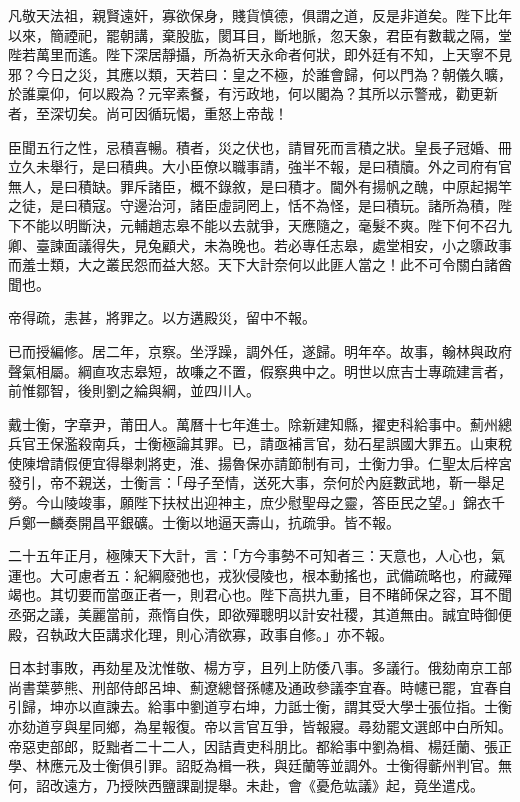 \begin{pinyinscope}
凡敬天法祖，親賢遠奸，寡欲保身，賤貨慎德，俱謂之道，反是非道矣。陛下比年以來，簡禋祀，罷朝講，棄股肱，閡耳目，斷地脈，忽天象，君臣有數載之隔，堂陛若萬里而遙。陛下深居靜攝，所為祈天永命者何狀，即外廷有不知，上天寧不見邪？今日之災，其應以類，天若曰：皇之不極，於誰會歸，何以門為？朝儀久曠，於誰稟仰，何以殿為？元宰素餐，有污政地，何以閣為？其所以示警戒，勸更新者，至深切矣。尚可因循玩愒，重怒上帝哉！

臣聞五行之性，忌積喜暢。積者，災之伏也，請冒死而言積之狀。皇長子冠婚、冊立久未舉行，是曰積典。大小臣僚以職事請，強半不報，是曰積牘。外之司府有官無人，是曰積缺。罪斥諸臣，概不錄敘，是曰積才。閫外有揚帆之醜，中原起揭竿之徒，是曰積寇。守邊治河，諸臣虛詞罔上，恬不為怪，是曰積玩。諸所為積，陛下不能以明斷決，元輔趙志皋不能以去就爭，天應隨之，毫髮不爽。陛下何不召九卿、臺諫面議得失，見兔顧犬，未為晚也。若必專任志皋，處堂相安，小之隳政事而羞士類，大之叢民怨而益大怒。天下大計奈何以此匪人當之！此不可令關白諸酋聞也。

帝得疏，恚甚，將罪之。以方遘殿災，留中不報。

已而授編修。居二年，京察。坐浮躁，調外任，遂歸。明年卒。故事，翰林與政府聲氣相屬。綱直攻志皋短，故嗛之不置，假察典中之。明世以庶吉士專疏建言者，前惟鄒智，後則劉之綸與綱，並四川人。

戴士衡，字章尹，莆田人。萬曆十七年進士。除新建知縣，擢吏科給事中。薊州總兵官王保濫殺南兵，士衡極論其罪。已，請亟補言官，劾石星誤國大罪五。山東稅使陳增請假便宜得舉刺將吏，淮、揚魯保亦請節制有司，士衡力爭。仁聖太后梓宮發引，帝不親送，士衡言：「母子至情，送死大事，奈何於內庭數武地，靳一舉足勞。今山陵竣事，願陛下扶杖出迎神主，庶少慰聖母之靈，答臣民之望。」錦衣千戶鄭一麟奏開昌平銀礦。士衡以地逼天壽山，抗疏爭。皆不報。

二十五年正月，極陳天下大計，言：「方今事勢不可知者三：天意也，人心也，氣運也。大可慮者五：紀綱廢弛也，戎狄侵陵也，根本動搖也，武備疏略也，府藏殫竭也。其切要而當亟正者一，則君心也。陛下高拱九重，目不睹師保之容，耳不聞丞弼之議，美麗當前，燕惰自佚，即欲殫聰明以計安社稷，其道無由。誠宜時御便殿，召執政大臣講求化理，則心清欲寡，政事自修。」亦不報。

日本封事敗，再劾星及沈惟敬、楊方亨，且列上防倭八事。多議行。俄劾南京工部尚書葉夢熊、刑部侍郎呂坤、薊遼總督孫幰及通政參議李宜春。時幰已罷，宜春自引歸，坤亦以直諫去。給事中劉道亨右坤，力詆士衡，謂其受大學士張位指。士衡亦劾道亨與星同鄉，為星報復。帝以言官互爭，皆報寢。尋劾罷文選郎中白所知。帝惡吏部郎，貶黜者二十二人，因詰責吏科朋比。都給事中劉為楫、楊廷蘭、張正學、林應元及士衡俱引罪。詔貶為楫一秩，與廷蘭等並調外。士衡得蘄州判官。無何，詔改遠方，乃授陜西鹽課副提舉。未赴，會《憂危竑議》起，竟坐遣戍。


\end{pinyinscope}
